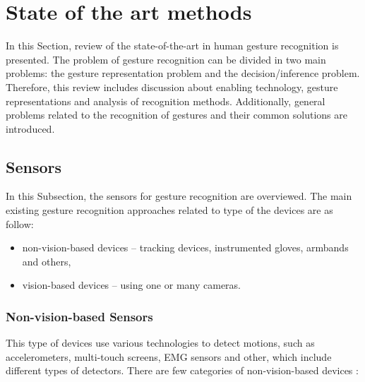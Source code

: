 \section{State of the art methods}
In this Section, review of the state-of-the-art in human gesture recognition is presented. The problem of gesture recognition can be divided in two main problems: the gesture representation problem and the decision/inference problem. Therefore, this review includes discussion about enabling technology, gesture representations and analysis of recognition methods. Additionally, general problems related to the recognition of gestures and their common solutions are introduced.

\subsection{Sensors}
In this Subsection, the sensors for gesture recognition are overviewed. The main existing gesture recognition approaches related to type of the devices are as follow:
\begin{itemize}
\item non-vision-based devices -- tracking devices, instrumented gloves, armbands and others,
\item vision-based devices -- using one or many cameras.
\end{itemize}

\subsubsection{Non-vision-based Sensors}

This type of devices use various technologies to detect motions, such as accelerometers, multi-touch screens, EMG sensors and other, which include different types of detectors. There are few categories of non-vision-based devices \cite{kaaniche2009human}:

